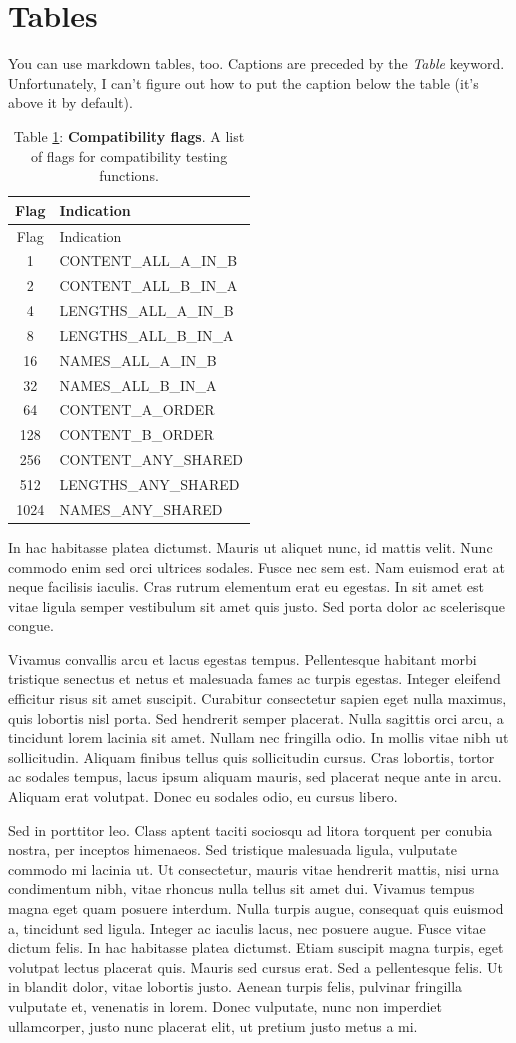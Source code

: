 \documentclass[10pt]{article}
\begin{document}
\hypertarget{tables}{%
\section{Tables}\label{tables}}

You can use markdown tables, too. Captions are preceded by the
\emph{Table} keyword. Unfortunately, I can't figure out how to put the
caption below the table (it's above it by default).

\begin{longtable}[]{@{}cl@{}}
\caption{Table \label{param_table}\ref{param_table}:
\textbf{Compatibility flags}. A list of flags for compatibility testing
functions.}\tabularnewline
\toprule
Flag & Indication\tabularnewline
\midrule
\endfirsthead
\toprule
Flag & Indication\tabularnewline
\midrule
\endhead
1 & CONTENT\_ALL\_A\_IN\_B\tabularnewline
2 & CONTENT\_ALL\_B\_IN\_A\tabularnewline
4 & LENGTHS\_ALL\_A\_IN\_B\tabularnewline
8 & LENGTHS\_ALL\_B\_IN\_A\tabularnewline
16 & NAMES\_ALL\_A\_IN\_B\tabularnewline
32 & NAMES\_ALL\_B\_IN\_A\tabularnewline
64 & CONTENT\_A\_ORDER\tabularnewline
128 & CONTENT\_B\_ORDER\tabularnewline
256 & CONTENT\_ANY\_SHARED\tabularnewline
512 & LENGTHS\_ANY\_SHARED\tabularnewline
1024 & NAMES\_ANY\_SHARED\tabularnewline
\bottomrule
\end{longtable}

In hac habitasse platea dictumst. Mauris ut aliquet nunc, id mattis
velit. Nunc commodo enim sed orci ultrices sodales. Fusce nec sem est.
Nam euismod erat at neque facilisis iaculis. Cras rutrum elementum erat
eu egestas. In sit amet est vitae ligula semper vestibulum sit amet quis
justo. Sed porta dolor ac scelerisque congue.

Vivamus convallis arcu et lacus egestas tempus. Pellentesque habitant
morbi tristique senectus et netus et malesuada fames ac turpis egestas.
Integer eleifend efficitur risus sit amet suscipit. Curabitur
consectetur sapien eget nulla maximus, quis lobortis nisl porta. Sed
hendrerit semper placerat. Nulla sagittis orci arcu, a tincidunt lorem
lacinia sit amet. Nullam nec fringilla odio. In mollis vitae nibh ut
sollicitudin. Aliquam finibus tellus quis sollicitudin cursus. Cras
lobortis, tortor ac sodales tempus, lacus ipsum aliquam mauris, sed
placerat neque ante in arcu. Aliquam erat volutpat. Donec eu sodales
odio, eu cursus libero.

Sed in porttitor leo. Class aptent taciti sociosqu ad litora torquent
per conubia nostra, per inceptos himenaeos. Sed tristique malesuada
ligula, vulputate commodo mi lacinia ut. Ut consectetur, mauris vitae
hendrerit mattis, nisi urna condimentum nibh, vitae rhoncus nulla tellus
sit amet dui. Vivamus tempus magna eget quam posuere interdum. Nulla
turpis augue, consequat quis euismod a, tincidunt sed ligula. Integer ac
iaculis lacus, nec posuere augue. Fusce vitae dictum felis. In hac
habitasse platea dictumst. Etiam suscipit magna turpis, eget volutpat
lectus placerat quis. Mauris sed cursus erat. Sed a pellentesque felis.
Ut in blandit dolor, vitae lobortis justo. Aenean turpis felis, pulvinar
fringilla vulputate et, venenatis in lorem. Donec vulputate, nunc non
imperdiet ullamcorper, justo nunc placerat elit, ut pretium justo metus
a mi.
\end{document}
